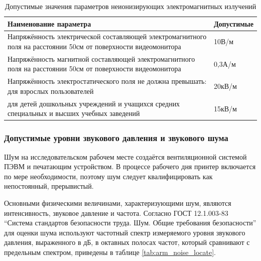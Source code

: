 \begin{table}[h]
\begin{longtable}[!ht]{|m{}|m{}|}
\caption{Допустимые значения параметров неионизирующих электромагнитных излучений}
\label{tab:min_neoinige_elwave}
\\ \hline
Наименование параметра & Допустимые \\ \hline
Напряжённость электрической составляющей электромагнитного поля на расстоянии 50см от поверхности видеомонитора & 10В/м\\ \hline
Напряжённость магнитной составляющей электромагнитного поля на расстоянии 50см от поверхности видеомонитора & 0,3А/м\\ \hline
Напряжённость электростатического поля не должна превышать: для взрослых пользователей & 20кВ/м\\ \hline
для детей дошкольных учреждений и учащихся средних специальных и высших учебных заведений & 15кВ/м\\ \hline
\end{longtable}
\end{table}

\subsubsection{Допустимые уровни звукового давления и звукового шума}

Шум на исследовательском рабочем месте создаётся вентиляционной системой ПЭВМ и печатающим устройством. В процессе рабочего дня принтер включается по мере необходимости, поэтому шум следует квалифицировать как непостоянный, прерывистый.

Основными физическими величинами, характеризующими шум, являются интенсивность, звуковое давление и частота. Согласно ГОСТ 12.1.003-83 ``Система стандартов безопасности труда. Шум. Общие требования безопасности'' для оценки шума используют частотный спектр измеряемого уровня звукового давления, выраженного в дБ, в октавных полосах частот, который сравнивают с предельным спектром, приведены в таблице \ref{tab:arm_noise_locate}.

